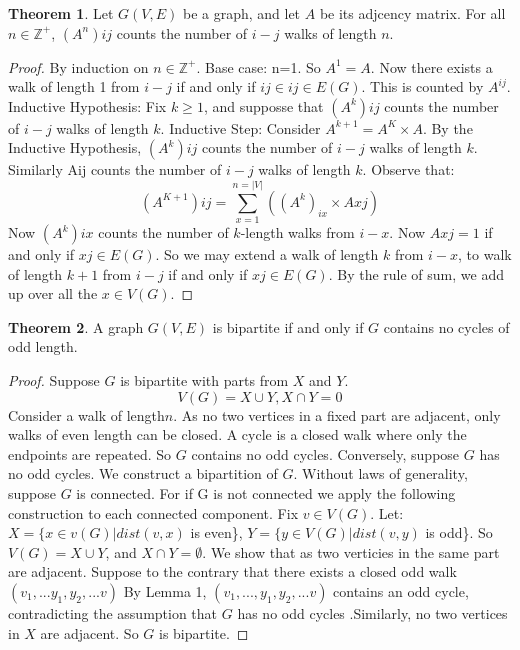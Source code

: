 \documentclass{article}
\theoremstyle{definition}
\newtheorem{thm}{Theorem}[section]
\begin{document}
\begin{thm}
Let $G(V,E)$ be a graph, and let $A$ be its adjcency matrix. For all $n \in \mathbb{Z}^+$, $(A^n)ij$ counts the number of $i-j$ walks of length $n$.
\end{thm}
\begin{proof} By induction on $n \in \mathbb{Z}^+$. Base case: n=1. So $A^1 = A$. Now there exists a walk of length 1 from $i-j$ if and only if $ij \in ij \in E(G)$. This is counted by $A^{ij}$. Inductive Hypothesis: Fix $k \geq 1$, and supposse that $(A^k)ij$ counts the number of $i-j$ walks of length $k$. Inductive Step: Consider $A^{k+1}= A^K\times A$. By the Inductive Hypothesis, $(A^k)ij$ counts the number of $i-j$ walks of length $k$. Similarly Aij counts the number of $i-j$ walks of length $k$. Observe that: $$(A^{K+1})ij = \sum_{x=1}^{n= |V|}((A^k)_{ix}\times Axj)$$ Now $(A^k)ix$ counts the number of $k$-length walks from $i-x$. Now $Axj=1$ if and only if $xj\in E(G)$. So we may extend a walk of length $k$ from $i-x$, to walk of length $k+1$ from $i-j$ if and only if $xj \in E(G)$. By the rule of sum, we add up over all the $x \in V(G)$.
\end{proof}
 
\begin{thm}
A graph $G(V, E)$ is bipartite if and only if $G$ contains no cycles of odd length.
\end{thm}
\begin{proof}
Suppose $G$ is bipartite with parts from $X$ and $Y$. $$V(G)=X\cup Y, X\cap Y=0$$ Consider a walk of length$n$. As no two vertices in a fixed part are adjacent, only walks of even length can be closed. A cycle is a closed walk where only the endpoints are repeated. So $G$ contains no odd cycles. Conversely, suppose $G$ has no odd cycles. We construct a bipartition of $G$. Without laws of generality, suppose $G$ is connected. For if G is not connected we apply the following construction to each connected component. Fix $v \in V(G)$. Let: $X = \{x\in v(G)|dist(v,x)$ is even\}, $Y = \{y \in V(G)|dist(v,y)$ is odd\}. So $V(G)=X \cup Y$, and $X \cap Y= \emptyset$. We show that as two verticies in the same part are adjacent. Suppose to the contrary that there exists a closed odd walk $(v_1,...y_1,y_2,...v)$ By Lemma 1, $(v _1,...,y_1,y_2,...v)$ contains an odd cycle, contradicting the assumption that $G$ has no odd cycles .Similarly, no two vertices in $X$ are adjacent. So $G$ is bipartite. 
\end{proof}
\end{document}
